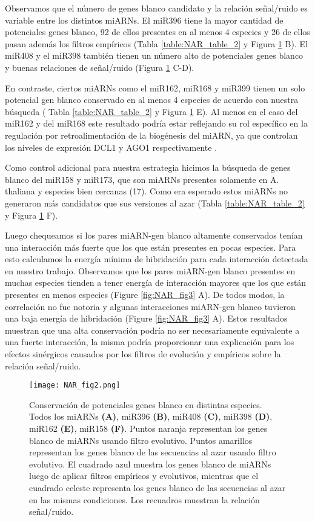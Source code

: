 Observamos que el número de genes blanco candidato y la relación señal/ruido es variable entre los distintos miARNs.
El miR396 tiene la mayor cantidad de potenciales genes blanco, 92 de ellos presentes en al menos 4 especies y 26 de ellos pasan además los filtros empíricos (Tabla \ref{table:NAR_table_2} y Figura \ref{fig:NAR_fig2} B).
El miR408 y el miR398 también tienen un número alto de potenciales genes blanco y buenas relaciones de señal/ruido (Figura \ref{fig:NAR_fig2} C-D).

En contraste, ciertos miARNs como el miR162, miR168 y miR399 tienen un solo potencial gen blanco conservado en al menos 4 especies de acuerdo con nuestra búsqueda ( Tabla \ref{table:NAR_table_2} y Figura \ref{fig:NAR_fig2} E).
Al menos en el caso del miR162 y del miR168 este resultado podría estar reflejando su rol específico en la regulación por retroalimentación de la biogénesis del miARN, ya que controlan los niveles de expresión DCL1 y AGO1 respectivamente \citep{Vazquez2004,Xie2003}.

Como control adicional para nuestra estrategia hicimos la búsqueda de genes blanco del miR158 y miR173, que son miARNs presentes solamente en A. thaliana y especies bien cercanas (17). Como era esperado estos miARNs no generaron más candidatos que sus versiones al azar (Tabla \ref{table:NAR_table_2} y Figura \ref{fig:NAR_fig2} F).


Luego chequeamos si los pares miARN-gen blanco altamente conservados tenían una interacción más fuerte que los que están presentes en pocas especies.
Para esto calculamos la energía mínima de hibridación para cada interacción detectada en nuestro trabajo. 
Observamos que los pares miARN-gen blanco presentes en muchas especies tienden a tener energía de interacción mayores que los que están presentes en menos especies (Figure \ref{fig:NAR_fig3} A).
De todos modos, la correlación no fue notoria y algunas interacciones miARN-gen blanco tuvieron una baja energía de hibridación (Figure \ref{fig:NAR_fig3} A).
Estos resultados muestran que una alta conservación podría no ser necesariamente equivalente a una fuerte interacción, la misma podría proporcionar una explicación para los efectos sinérgicos causados por los filtros de evolución y empíricos sobre la relación señal/ruido.

\begin{figure}[htbp!] 
    \centering    
    \texttt{[image: NAR\_fig2.png]}
    \caption[Conservación de potenciales genes blanco en distintas especies]{Conservación de potenciales genes blanco en distintas especies. Todos los miARNs 
    \textbf{(A)}, miR396 \textbf{(B)}, miR408 \textbf{(C)}, miR398 \textbf{(D)}, miR162 \textbf{(E)}, miR158 \textbf{(F)}.
    Puntos naranja representan los genes blanco de miARNs usando filtro evolutivo.
    Puntos amarillos representan los genes blanco de las secuencias al azar usando filtro evolutivo.
    El cuadrado azul muestra los genes blanco de miARNs luego de aplicar filtros empíricos y evolutivos, mientras que el cuadrado celeste representa los genes blanco de las secuencias al azar en las mismas condiciones.
    Los recuadros muestran la relación señal/ruido.}
    \label{fig:NAR_fig2}
\end{figure}

